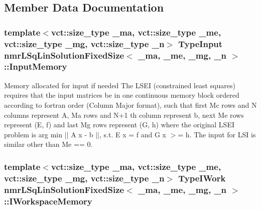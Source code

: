 \subsection{Member Data Documentation}
\hypertarget{classnmr_l_sq_lin_solution_fixed_size_aabb06ec545a84d0e6cf73353c88d7bba}{
\subsubsection[{Input\-Memory}]{\setlength{\rightskip}{0pt plus 5cm}template$<$vct\-::size\-\_\-type \-\_\-ma, vct\-::size\-\_\-type \-\_\-me, vct\-::size\-\_\-type \-\_\-mg, vct\-::size\-\_\-type \-\_\-n$>$ {\bf Type\-Input} {\bf nmr\-L\-Sq\-Lin\-Solution\-Fixed\-Size}$<$ \-\_\-ma, \-\_\-me, \-\_\-mg, \-\_\-n $>$\-::Input\-Memory\hspace{0.3cm}{\ttfamily [protected]}}}\label{classnmr_l_sq_lin_solution_fixed_size_aabb06ec545a84d0e6cf73353c88d7bba}
Memory allocated for input if needed The L\-S\-E\-I (constrained least squares) requires that the input matrices be in one continuous memory block ordered according to fortran order (Column Major format), such that first Mc rows and N columns represent A, Ma rows and N+1 th column represent b, next Me rows represent (E, f) and last Mg rows represent (G, h) where the original L\-S\-E\-I problem is arg min $\vert$$\vert$ A x -\/ b $\vert$$\vert$, s.\-t. E x = f and G x $>$= h. The input for L\-S\-I is similar other than Me == 0. \hypertarget{classnmr_l_sq_lin_solution_fixed_size_a679c28e537d3e2c4d0be4592715715eb}{
\subsubsection[{I\-Workspace\-Memory}]{\setlength{\rightskip}{0pt plus 5cm}template$<$vct\-::size\-\_\-type \-\_\-ma, vct\-::size\-\_\-type \-\_\-me, vct\-::size\-\_\-type \-\_\-mg, vct\-::size\-\_\-type \-\_\-n$>$ {\bf Type\-I\-Work} {\bf nmr\-L\-Sq\-Lin\-Solution\-Fixed\-Size}$<$ \-\_\-ma, \-\_\-me, \-\_\-mg, \-\_\-n $>$\-::I\-Workspace\-Memory\hspace{0.3cm}{\ttfamily [protected]}}}\label{classnmr_l_sq_lin_solution_fixed_size_a679c28e537d3e2c4d0be4592715715eb}
